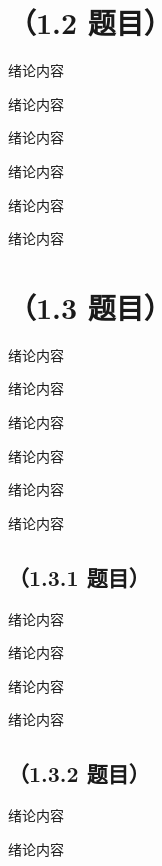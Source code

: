 \section{（1.2 题目）}
绪论内容

绪论内容

绪论内容

绪论内容

绪论内容

绪论内容

\section{（1.3 题目）}
绪论内容

绪论内容

绪论内容

绪论内容

绪论内容

绪论内容

\subsection{（1.3.1 题目）}
绪论内容

绪论内容

绪论内容

绪论内容

\subsection{（1.3.2 题目）}

绪论内容

绪论内容


